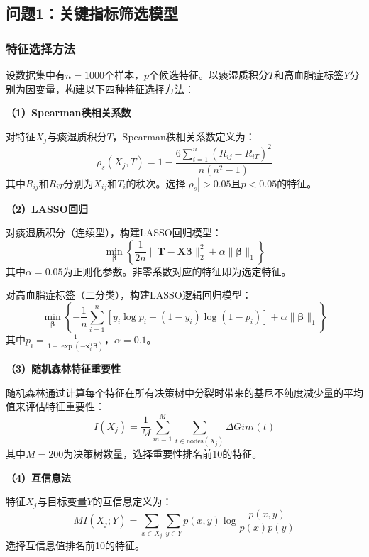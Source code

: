 \documentclass[12pt,a4paper]{ctexart}
\begin{document}
\subsection{问题1：关键指标筛选模型}

\subsubsection{特征选择方法}

设数据集中有$n=1000$个样本，$p$个候选特征。以痰湿质积分$T$和高血脂症标签$Y$分别为因变量，构建以下四种特征选择方法：

\textbf{（1）Spearman秩相关系数}

对特征$X_j$与痰湿质积分$T$，Spearman秩相关系数定义为：
\begin{equation}
    \rho_s(X_j, T) = 1 - \frac{6\sum_{i=1}^{n}(R_{ij} - R_{iT})^2}{n(n^2-1)}
\end{equation}
其中$R_{ij}$和$R_{iT}$分别为$X_{ij}$和$T_i$的秩次。选择$|\rho_s| > 0.05$且$p < 0.05$的特征。

\textbf{（2）LASSO回归}

对痰湿质积分（连续型），构建LASSO回归模型：
\begin{equation}
    \min_{\bm{\beta}} \left\{ \frac{1}{2n}\|\mathbf{T} - \mathbf{X}\bm{\beta}\|_2^2 + \alpha\|\bm{\beta}\|_1 \right\}
\end{equation}
其中$\alpha=0.05$为正则化参数。非零系数对应的特征即为选定特征。

对高血脂症标签（二分类），构建LASSO逻辑回归模型：
\begin{equation}
    \min_{\bm{\beta}} \left\{ -\frac{1}{n}\sum_{i=1}^{n}\left[y_i\log p_i + (1-y_i)\log(1-p_i)\right] + \alpha\|\bm{\beta}\|_1 \right\}
\end{equation}
其中$p_i = \frac{1}{1+\exp(-\mathbf{x}_i^T\bm{\beta})}$，$\alpha=0.1$。

\textbf{（3）随机森林特征重要性}

随机森林通过计算每个特征在所有决策树中分裂时带来的基尼不纯度减少量的平均值来评估特征重要性：
\begin{equation}
    I(X_j) = \frac{1}{M}\sum_{m=1}^{M}\sum_{t \in \text{nodes}(X_j)} \Delta Gini(t)
\end{equation}
其中$M=200$为决策树数量，选择重要性排名前10的特征。

\textbf{（4）互信息法}

特征$X_j$与目标变量$Y$的互信息定义为：
\begin{equation}
    MI(X_j; Y) = \sum_{x \in X_j}\sum_{y \in Y} p(x,y)\log\frac{p(x,y)}{p(x)p(y)}
\end{equation}
选择互信息值排名前10的特征。
\end{document}
